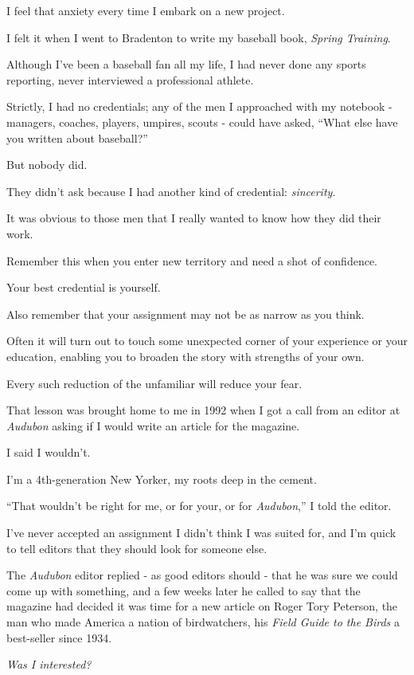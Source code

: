 \documentclass{book}
\numberwithin{equation}{section}
\begin{document}
I feel that anxiety every time I embark on a new project.

I felt it when I went to Bradenton to write my baseball book, \textit{Spring Training}.

Although I've been a baseball fan all my life, I had never done any sports reporting, never interviewed a professional athlete.

Strictly, I had no credentials; any of the men I approached with my notebook - managers, coaches, players, umpires, scouts - could have asked, ``What else have you written about baseball?''

But nobody did.

They didn't ask because I had another kind of credential: \textit{sincerity}.

It was obvious to those men that I really wanted to know how they did their work.

Remember this when you enter new territory and need a shot of confidence.

Your best credential is yourself.

%
Also remember that your assignment may not be as narrow as you think.

Often it will turn out to touch some unexpected corner of your experience or your education, enabling you to broaden the story with strengths of your own.

Every such reduction of the unfamiliar will reduce your fear.

That lesson was brought home to me in 1992 when I got a call from an editor at \textit{Audubon} asking if I would write an article for the magazine.

I said I wouldn't.

I'm a 4th-generation New Yorker, my roots deep in the cement.

``That wouldn't be right for me, or for your, or for \textit{Audubon},'' I told the editor.

I've never accepted an assignment I didn't think I was suited for, and I'm quick to tell editors that they should look for someone else.

The \textit{Audubon} editor replied - as good editors should - that he was sure we could come up with something, and a few weeks later he called to say that the magazine had decided it was time for a new article on Roger Tory Peterson, the man who made America a nation of birdwatchers, his \textit{Field Guide to the Birds} a best-seller since 1934.

\textit{Was I interested?}
\end{document}
